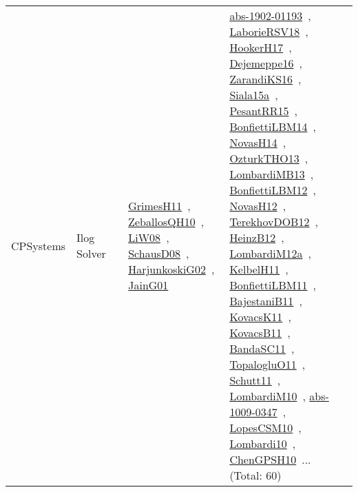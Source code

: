 {\begin{longtable}{lp{3cm}>{\raggedright\arraybackslash}p{6cm}>{\raggedright\arraybackslash}p{6cm}>{\raggedright\arraybackslash}p{8cm}}
CPSystems & Ilog Solver &  & \href{works/GrimesH11.pdf}{GrimesH11}~\cite{GrimesH11}, \href{works/ZeballosQH10.pdf}{ZeballosQH10}~\cite{ZeballosQH10}, \href{works/LiW08.pdf}{LiW08}~\cite{LiW08}, \href{works/SchausD08.pdf}{SchausD08}~\cite{SchausD08}, \href{works/HarjunkoskiG02.pdf}{HarjunkoskiG02}~\cite{HarjunkoskiG02}, \href{works/JainG01.pdf}{JainG01}~\cite{JainG01} & \href{works/abs-1902-01193.pdf}{abs-1902-01193}~\cite{abs-1902-01193}, \href{works/LaborieRSV18.pdf}{LaborieRSV18}~\cite{LaborieRSV18}, \href{works/HookerH17.pdf}{HookerH17}~\cite{HookerH17}, \href{works/Dejemeppe16.pdf}{Dejemeppe16}~\cite{Dejemeppe16}, \href{works/ZarandiKS16.pdf}{ZarandiKS16}~\cite{ZarandiKS16}, \href{works/Siala15a.pdf}{Siala15a}~\cite{Siala15a}, \href{works/PesantRR15.pdf}{PesantRR15}~\cite{PesantRR15}, \href{works/BonfiettiLBM14.pdf}{BonfiettiLBM14}~\cite{BonfiettiLBM14}, \href{works/NovasH14.pdf}{NovasH14}~\cite{NovasH14}, \href{works/OzturkTHO13.pdf}{OzturkTHO13}~\cite{OzturkTHO13}, \href{works/LombardiMB13.pdf}{LombardiMB13}~\cite{LombardiMB13}, \href{works/BonfiettiLBM12.pdf}{BonfiettiLBM12}~\cite{BonfiettiLBM12}, \href{works/NovasH12.pdf}{NovasH12}~\cite{NovasH12}, \href{works/TerekhovDOB12.pdf}{TerekhovDOB12}~\cite{TerekhovDOB12}, \href{works/HeinzB12.pdf}{HeinzB12}~\cite{HeinzB12}, \href{works/LombardiM12a.pdf}{LombardiM12a}~\cite{LombardiM12a}, \href{works/KelbelH11.pdf}{KelbelH11}~\cite{KelbelH11}, \href{works/BonfiettiLBM11.pdf}{BonfiettiLBM11}~\cite{BonfiettiLBM11}, \href{works/BajestaniB11.pdf}{BajestaniB11}~\cite{BajestaniB11}, \href{works/KovacsK11.pdf}{KovacsK11}~\cite{KovacsK11}, \href{works/KovacsB11.pdf}{KovacsB11}~\cite{KovacsB11}, \href{works/BandaSC11.pdf}{BandaSC11}~\cite{BandaSC11}, \href{works/TopalogluO11.pdf}{TopalogluO11}~\cite{TopalogluO11}, \href{works/Schutt11.pdf}{Schutt11}~\cite{Schutt11}, \href{works/LombardiM10.pdf}{LombardiM10}~\cite{LombardiM10}, \href{works/abs-1009-0347.pdf}{abs-1009-0347}~\cite{abs-1009-0347}, \href{works/LopesCSM10.pdf}{LopesCSM10}~\cite{LopesCSM10}, \href{works/Lombardi10.pdf}{Lombardi10}~\cite{Lombardi10}, \href{works/ChenGPSH10.pdf}{ChenGPSH10}~\cite{ChenGPSH10}... (Total: 60)\\

\end{longtable}}

